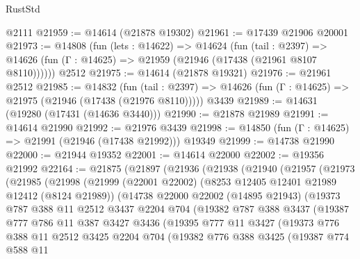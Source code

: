 \begin{lexlean}{RustStd}
\begin{coremodule}
    @2111
@21959 := @14614 (@21878 @19302)
@21961 := @17439 @21906 @20001
@21973 := @14808
    (fun (lets : @14622) =>
    @14624
      (fun (tail : @2397) =>
      @14626 (fun (Γ : @14625) => @21959 (@21946 (@17438 (@21961 @8107 @8110))))))
    @2512
@21975 := @14614 (@21878 @19321)
@21976 := @21961 @2512
@21985 := @14832
    (fun (tail : @2397) => @14626 (fun (Γ : @14625) => @21975 (@21946 (@17438 (@21976 @8110)))))
    @3439
@21989 := @14631 (@19280 (@17431 (@14636 @3440)))
@21990 := @21878 @21989
@21991 := @14614 @21990
@21992 := @21976 @3439
@21998 := @14850 (fun (Γ : @14625) => @21991 (@21946 (@17438 @21992))) @19349
@21999 := @14738 @21990
@22000 := @21944 @19352
@22001 := @14614 @22000
@22002 := @19356 @21992
@22164 := @21875
    (@21897
      (@21936
        (@21938
          (@21940
            (@21957
              (@21973
                (@21985
                  (@21998
                    (@21999
                      (@22001 @22002)
                      (@8253 @12405 @12401 @21989 @12412 (@8124 @21989))
                      (@14738
                        @22000
                        @22002
                        (@14895 @21943)
                        (@19373
                          @787
                          @388
                          @11
                          @2512
                          @3437
                          @2204
                          @704
                          (@19382
                            @787
                            @388
                            @3437
                            (@19387
                              @777
                              @786
                              @11
                              @387
                              @3427
                              @3436
                              (@19395
                                @777
                                @11
                                @3427
                                (@19373
                                  @776
                                  @388
                                  @11
                                  @2512
                                  @3425
                                  @2204
                                  @704
                                  (@19382
                                    @776
                                    @388
                                    @3425
                                    (@19387
                                      @774
                                      @588
                                      @11

\end{coremodule}
\end{lexlean}
